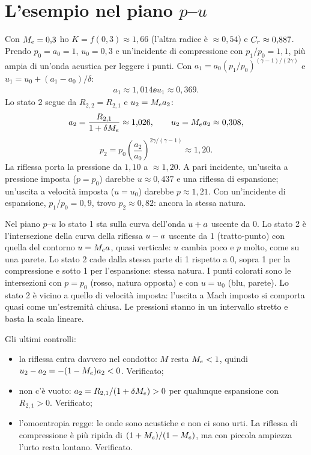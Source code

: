 \section*{L'esempio nel piano $p$--$u$}
Con $M_e=0{,}3$ ho $K=f(0{,}3)\approx1{,}66$ (l'altra radice è $\approx0{,}54$) e $C_r\approx0{,}887$. Prendo $p_0=a_0=1$,
$u_0=0{,}3$ e un'incidente di compressione con $p_1/p_0=1{,}1$, più ampia di un'onda acustica per leggere i punti.
Con $a_1=a_0(p_1/p_0)^{(\gamma-1)/(2\gamma)}$ e $u_1=u_0+(a_1-a_0)/\delta$:
\begin{gather*}
  a_1\approx1{,}014 \ee u_1\approx0{,}369 .
\end{gather*}
Lo stato 2 segue da $R_{2,2}=R_{2,1}$ e $u_2=M_e a_2$:
\begin{gather*}
  a_2=\frac{R_{2,1}}{1+\delta M_e}\approx1{,}026 ,\qquad u_2=M_e a_2\approx0{,}308,
\end{gather*}
\[
  p_2=p_0\left(\frac{a_2}{a_0}\right)^{2\gamma/(\gamma-1)}\approx1{,}20 .
\]
La riflessa porta la pressione da $1{,}10$ a $\approx1{,}20$. A pari incidente, un'uscita a pressione imposta
($p=p_0$) darebbe $u\approx0{,}437$ e una riflessa di espansione; un'uscita a velocità imposta ($u=u_0$) darebbe
$p\approx1{,}21$. Con un'incidente di espansione, $p_1/p_0=0{,}9$, trovo $p_2\approx0{,}82$: ancora la stessa natura.


Nel piano $p$--$u$ lo stato 1 sta sulla curva dell'onda $u+a$ uscente da 0. Lo stato 2 è l'intersezione della curva
della riflessa $u-a$ uscente da 1 (tratto-punto) con quella del contorno $u=M_e a$, quasi verticale: $u$ cambia poco
e $p$ molto, come su una parete. Lo stato 2 cade dalla stessa parte di 1 rispetto a 0, sopra 1 per la compressione e
sotto 1 per l'espansione: stessa natura. I punti colorati sono le intersezioni con $p=p_0$ (rosso, natura opposta)
e con $u=u_0$ (blu, parete). Lo stato 2 è vicino a quello di velocità imposta: l'uscita a Mach imposto si comporta
quasi come un'estremità chiusa. Le pressioni stanno in un intervallo stretto e basta la scala lineare.

Gli ultimi controlli:
\begin{itemize}
  \item la riflessa entra davvero nel condotto: $M$ resta $M_e<1$, quindi $u_2-a_2=-(1-M_e)a_2<0$. Verificato;
  \item non c'è vuoto: $a_2=R_{2,1}/(1+\delta M_e)>0$ per qualunque espansione con $R_{2,1}>0$. Verificato;
  \item l'omoentropia regge: le onde sono acustiche e non ci sono urti. La riflessa di compressione è più ripida di
        $(1+M_e)/(1-M_e)$, ma con piccola ampiezza l'urto resta lontano. Verificato.
\end{itemize}

